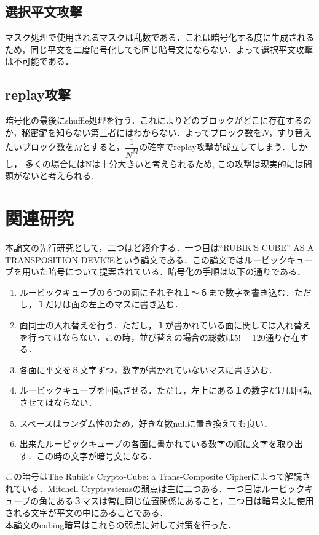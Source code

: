 \documentclass[a4p]{jarticle}
\begin{document}
\subsection{選択平文攻撃}
マスク処理で使用されるマスクは乱数である．これは暗号化する度に生成されるため，同じ平文を二度暗号化しても同じ暗号文にならない．よって選択平文攻撃は不可能である．
\subsection{replay攻撃}
暗号化の最後にshuffle処理を行う．これによりどのブロックがどこに存在するのか，秘密鍵を知らない第三者にはわからない．よってブロック数を\(N\)，すり替えたいブロック数を\(M\)とすると，\(\dfrac{1}{N^M}\)の確率でreplay攻撃が成立してしまう．しかし， 多くの場合にはNは十分大きいと考えられるため, この攻撃は現実的には問題がないと考えられる.

\section{関連研究}

本論文の先行研究として，二つほど紹介する．一つ目は“RUBIK'S CUBE” AS A TRANSPOSITION DEVICE\cite{Mitchell}という論文である．この論文ではルービックキューブを用いた暗号について提案されている．暗号化の手順は以下の通りである．
\begin{enumerate}
  \item ルービックキューブの６つの面にそれぞれ１〜６まで数字を書き込む．ただし，１だけは面の左上のマスに書き込む．
  \item 面同士の入れ替えを行う．ただし，１が書かれている面に関しては入れ替えを行ってはならない．この時，並び替えの場合の総数は\(5!=120\)通り存在する．
  \item 各面に平文を８文字ずつ，数字が書かれていないマスに書き込む．
  \item ルービックキューブを回転させる．ただし，左上にある１の数字だけは回転させてはならない．
  \item スペースはランダム性のため，好きな数nullに置き換えても良い．
  \item 出来たルービックキューブの各面に書かれている数字の順に文字を取り出す．この時の文字が暗号文になる．
\end{enumerate}

この暗号はThe Rubik's Crypto-Cube: a Trans-Composite Cipher\cite{Trans-Composite Cipher}によって解読されている．Mitchell Cryptsystemsの弱点は主に二つある．一つ目はルービックキューブの角にある３マスは常に同じ位置関係にあること，二つ目は暗号文に使用される文字が平文の中にあることである．\\
本論文のcubing暗号はこれらの弱点に対して対策を行った．\\\\
\end{document}
